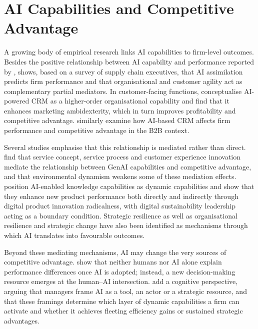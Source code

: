 \section{AI Capabilities and Competitive Advantage}
\label{sec:ai-ca}

A growing body of empirical research links AI capabilities to firm-level outcomes. Besides the positive relationship between AI capability and performance reported by \textcite[1]{mikalef2021capability}, \textcite[1]{fossowamba2022} shows, based on a survey of supply chain executives, that AI assimilation predicts firm performance and that organisational and customer agility act as complementary partial mediators. In customer-facing functions, \textcite[1]{alnofeli2026} conceptualise AI-powered CRM as a higher-order organisational capability and find that it enhances marketing ambidexterity, which in turn improves profitability and competitive advantage. \textcite[205]{chatterjee2021} similarly examine how AI-based CRM affects firm performance and competitive advantage in the B2B context.

Several studies emphasise that this relationship is mediated rather than direct. \textcite[10]{li2025} find that service concept, service process and customer experience innovation mediate the relationship between GenAI capabilities and competitive advantage, and that environmental dynamism weakens some of these mediation effects. \textcite[84]{dinh2026} position AI-enabled knowledge capabilities as dynamic capabilities and show that they enhance new product performance both directly and indirectly through digital product innovation radicalness, with digital sustainability leadership acting as a boundary condition. Strategic resilience \parencite[1]{wang2026} as well as organisational resilience and strategic change \parencite[1]{liang2026} have also been identified as mechanisms through which AI translates into favourable outcomes.

Beyond these mediating mechanisms, AI may change the very sources of competitive advantage. \textcite[1425]{krakowski2023} show that neither humans nor AI alone explain performance differences once AI is adopted; instead, a new decision-making resource emerges at the human--AI intersection. \textcite[1]{wu2026} add a cognitive perspective, arguing that managers frame AI as a tool, an actor or a strategic resource, and that these framings determine which layer of dynamic capabilities a firm can activate and whether it achieves fleeting efficiency gains or sustained strategic advantages.

